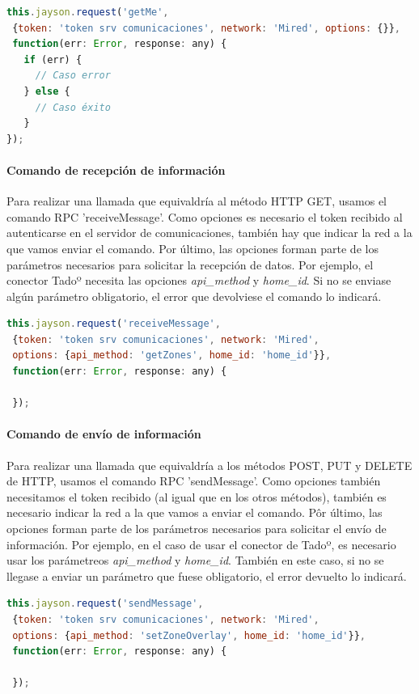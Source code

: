 \documentclass[spanish,12pt, a4paper, twoside]{paper}
\begin{document}
\begin{lstlisting}[language=Javascript]
this.jayson.request('getMe',
 {token: 'token srv comunicaciones', network: 'Mired', options: {}}, 
 function(err: Error, response: any) {
   if (err) {
     // Caso error
   } else {
     // Caso éxito
   }
});
\end{lstlisting}

\paragraph{Comando de recepción de información}

Para realizar una llamada que equivaldría al método HTTP GET, usamos el comando RPC 'receiveMessage'. Como opciones es necesario el token recibido al autenticarse en el servidor de comunicaciones, también hay que indicar la red a la que vamos enviar el comando. Por último, las opciones forman parte de los parámetros necesarios para solicitar la recepción de datos. Por ejemplo, el conector Tadoº necesita las opciones \emph{api\_method} y \emph{home\_id}. Si no se enviase algún parámetro obligatorio, el error que devolviese el comando lo indicará.

\begin{lstlisting}[language=JavaScript]
this.jayson.request('receiveMessage',
 {token: 'token srv comunicaciones', network: 'Mired',
 options: {api_method: 'getZones', home_id: 'home_id'}}, 
 function(err: Error, response: any) {
 
 });
\end{lstlisting}

\paragraph{Comando de envío de información}

Para realizar una llamada que equivaldría a los métodos POST, PUT y DELETE de HTTP, usamos el comando RPC 'sendMessage'. Como opciones también necesitamos el token recibido (al igual que en los otros métodos), también es necesario indicar la red a la que vamos a enviar el comando. Pôr último, las opciones forman parte de los parámetros necesarios para solicitar el envío de información. Por ejemplo, en el caso de usar el conector de Tadoº, es necesario usar los parámetreos \emph{api\_method} y \emph{home\_id}. También en este caso, si no se llegase a enviar un parámetro que fuese obligatorio, el error devuelto lo indicará.

\begin{lstlisting}[language=JavaScript]
this.jayson.request('sendMessage',
 {token: 'token srv comunicaciones', network: 'Mired',
 options: {api_method: 'setZoneOverlay', home_id: 'home_id'}}, 
 function(err: Error, response: any) {
 
 });
\end{lstlisting}
\end{document}
